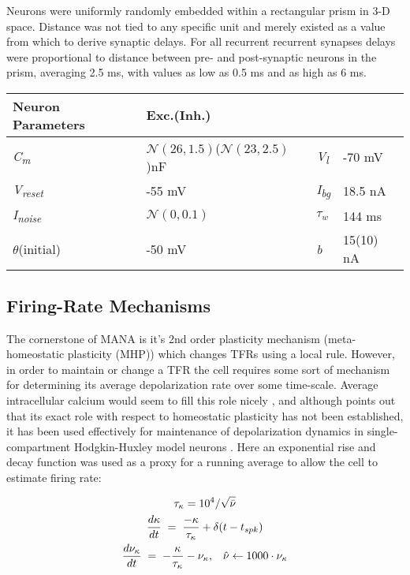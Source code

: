 \documentclass[10pt,letterpaper]{article}
\begin{document}
Neurons were uniformly randomly embedded within a rectangular prism in 3-D space. Distance was not tied to any specific unit and merely existed as a value from which to derive synaptic delays. For all recurrent \textrightarrow recurrent synapses delays were proportional to distance between pre- and post-synaptic neurons in the prism, averaging 2.5 ms, with values as low as 0.5 ms and as high as 6 ms. 


\begin{tabular}{ l l l l }
	\textbf{Neuron Parameters} & Exc.(Inh.)& & \\ \hline
	\emph{C\textsubscript{m}} & $\mathcal{N}(26, 1.5)$($\mathcal{N}(23, 2.5)$)nF & \emph{V\textsubscript{l}} & -70 mV \\
	 \emph{V\textsubscript{reset}} & -55 mV &  \emph{I\textsubscript{bg}} & 18.5 nA \\
	  \emph{I\textsubscript{noise}} & $\mathcal{N}(0, 0.1)$ & $\tau_w$ & 144 ms \\
	  $\theta$(initial) & -50 mV & \emph{b} & 15(10) nA \\
\end{tabular}

\subsection*{Firing-Rate Mechanisms}
	
The cornerstone of MANA is it's 2nd order plasticity mechanism (meta-homeostatic plasticity (MHP)) which changes TFRs using a local rule. However, in order to maintain or change a TFR the cell requires some sort of mechanism for determining its average depolarization rate over some time-scale. Average intracellular calcium would seem to fill this role nicely \cite{golowasch1999network}\cite{lemasson1993activity}, and although \cite{turrigiano2004homeostatic} points out that its exact role with respect to homeostatic plasticity has not been established, it has been used effectively for maintenance of depolarization dynamics in single-compartment Hodgkin-Huxley model neurons \cite{o2014cell}. Here an exponential rise and decay function was used as a proxy for a running average to allow the cell to estimate firing rate:	

\begin{gather}
	\tau_\kappa = 10^4/\sqrt{\bar{\nu}} \notag \\ 
	\frac{d\kappa}{dt} \;=\; \frac{-\kappa}{\tau_\kappa} + \delta(t - t_{spk}) \\
	\frac{d\nu_{\kappa}}{dt} \;=\; -\frac{\kappa}{\tau_\kappa} - \nu_{\kappa}, \;\;\; \hat{\nu} \leftarrow 1000\cdot\nu_{\kappa} \notag
\end{gather}
		
\end{document}
